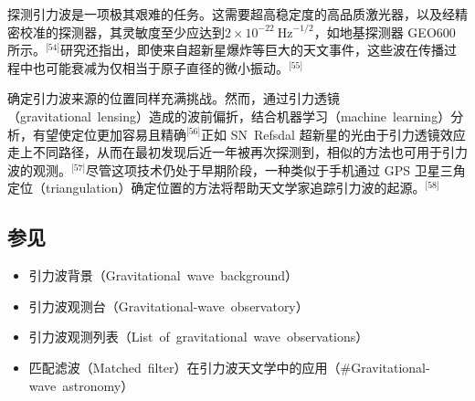 探测引力波是一项极其艰难的任务。这需要超高稳定度的高品质激光器，以及经精密校准的探测器，其灵敏度至少应达到$2\!\times\!10^{-22}\ \mathrm{Hz}^{-1/2}$，如地基探测器 GEO600 所示。\(^\text{[54]}\)研究还指出，即使来自超新星爆炸等巨大的天文事件，这些波在传播过程中也可能衰减为仅相当于原子直径的微小振动。\(^\text{[55]}\)

确定引力波来源的位置同样充满挑战。然而，通过引力透镜（gravitational~lensing）造成的波前偏折，结合机器学习（machine~learning）分析，有望使定位更加容易且精确\(^\text{[56]}\)正如 SN~Refsdal 超新星的光由于引力透镜效应走上不同路径，从而在最初发现后近一年被再次探测到，相似的方法也可用于引力波的观测。\(^\text{[57]}\)尽管这项技术仍处于早期阶段，一种类似于手机通过 GPS 卫星三角定位（triangulation）确定位置的方法将帮助天文学家追踪引力波的起源。\(^\text{[58]}\)
\subsection{参见}
\begin{itemize}
  \item 引力波背景（Gravitational~wave~background）
  \item 引力波观测台（Gravitational\mbox{-}wave~observatory）
  \item 引力波观测列表（List~of~gravitational~wave~observations）
  \item 匹配滤波（Matched~filter）在引力波天文学中的应用（\#Gravitational\mbox{-}wave~astronomy）
\end{itemize}
